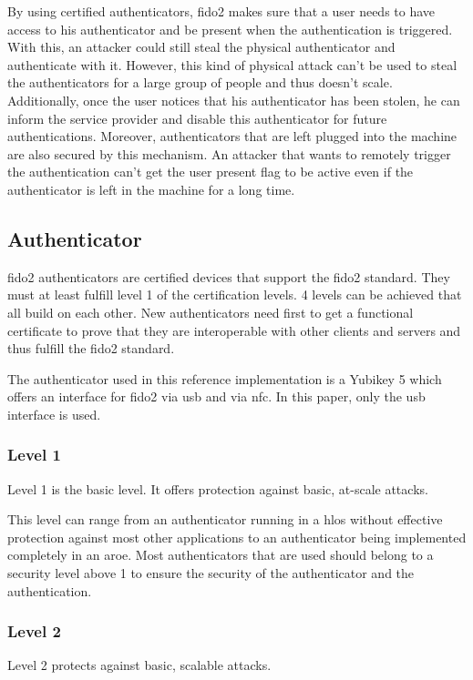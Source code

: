 \documentclass[a4paper, 11pt]{scrartcl}
\begin{document}
By using certified authenticators, \gls{fido2} makes sure that a user needs to have access to his authenticator and be present when the authentication is triggered. With this, an attacker could still steal the physical authenticator and authenticate with it. However, this kind of physical attack can't be used to steal the authenticators for a large group of people and thus doesn't scale. Additionally, once the user notices that his authenticator has been stolen, he can inform the service provider and disable this authenticator for future authentications. Moreover, authenticators that are left plugged into the machine are also secured by this mechanism. An attacker that wants to remotely trigger the authentication can't get the user present flag to be active even if the authenticator is left in the machine for a long time. 

\subsection{Authenticator}
\gls{fido2} authenticators are certified devices that support the \gls{fido2} standard. They must at least fulfill level 1 of the certification levels. 4 levels can be achieved that all build on each other. New authenticators need first to get a functional certificate to prove that they are interoperable with other clients and servers and thus fulfill the \gls{fido2} standard.

The authenticator used in this reference implementation is a Yubikey 5 which offers an interface for \gls{fido2} via \gls{usb} and via \gls{nfc}. In this paper, only the \gls{usb} interface is used.

\subsubsection{Level 1}
Level 1 is the basic level. It offers protection against basic, at-scale attacks\cite{fido:authenticator:level1}.

This level can range from an authenticator running in a \gls{hlos} without effective protection against most other applications to an authenticator being implemented completely in an \gls{aroe}. Most authenticators that are used should belong to a security level above 1 to ensure the security of the authenticator and the authentication\cite{fido:authenticator:level1}.

\subsubsection{Level 2}
Level 2 protects against basic, scalable attacks\cite{fido:authenticator:level2}.
\end{document}
